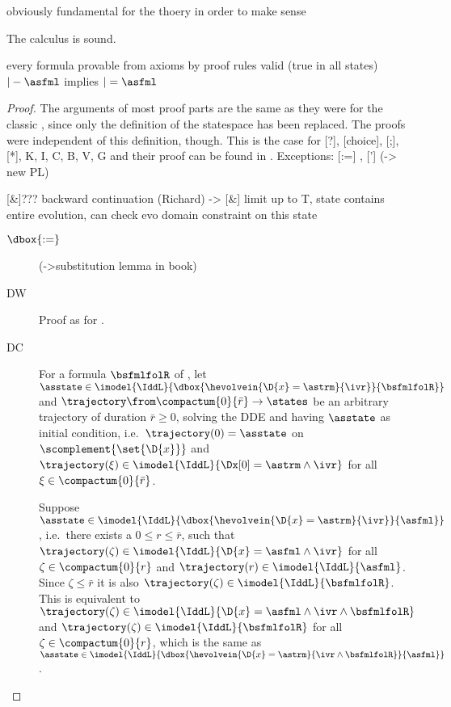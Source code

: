     obviously fundamental for the thoery in order to make sense

    \begin{theorem}
        \label{thm:dL-soundness}
        The \ddL calculus is sound.

        every formula provable from \ddL axioms by \ddL proof rules
        valid (true in all states)
        $|-\asfml$ implies $|=\asfml$

    \end{theorem}
    \begin{proof}
        The arguments of most proof parts are the same as they were for the classic \dL, since only the definition of the statespace has been replaced. The proofs were independent of this definition, though. This is the case for [?], [choice], [;], [*], K, I, C, B, V, G and their proof can be found in \cite{Platzer12Complete}.
        Exceptions: [:=] , ['] (-> new PL)

        [\&]???
        backward continuation (Richard) -> [\&] limit up to T, state contains entire evolution, can check evo domain constraint on this state

    \begin{description}
        \item[$\dbox{:=}$] (->substitution lemma in book)
        \item[DW] Proof as for \dL.
        \item[DC] For a formula $\bsfmlfolR$ of \FOLR, let $\asstate\in\imodel{\IddL}{\dbox{\hevolvein{\D{x}=\astrm}{\ivr}}{\bsfmlfolR}}$ and $\trajectory\from\compactum{0}{\bar{r}}\to\states$ be an arbitrary trajectory of duration $\bar{r}\geq 0$, solving the DDE and having $\asstate$ as initial condition, i.e.\ $\trajectory(0)=\asstate$ on $\scomplement{\set{\D{x}}}$ and $\trajectory(\xi)\in\imodel{\IddL}{\Dx[0]=\astrm\land\ivr}$ for all $\xi\in\compactum{0}{\bar{r}}$.

        Suppose $\asstate\in\imodel{\IddL}{\dbox{\hevolvein{\D{x}=\astrm}{\ivr}}{\asfml}}$, i.e.\ there exists a $0\leq r\leq\bar{r}$, such that $\trajectory(\zeta)\in\imodel{\IddL}{\D{x}=\asfml\land\ivr}$ for all $\zeta\in\compactum{0}{r}$ and $\trajectory(r)\in\imodel{\IddL}{\asfml}$. Since $\zeta\leq\bar{r}$ it is also $\trajectory(\zeta)\in\imodel{\IddL}{\bsfmlfolR}$. This is equivalent to $\trajectory(\zeta)\in\imodel{\IddL}{\D{x}=\asfml\land\ivr\land\bsfmlfolR}$ and $\trajectory(\zeta)\in\imodel{\IddL}{\bsfmlfolR}$ for all $\zeta\in\compactum{0}{r}$, which is the same as $\asstate\in\imodel{\IddL}{\dbox{\hevolvein{\D{x}=\astrm}{\ivr\land\bsfmlfolR}}{\asfml}}$.


\end{description}
\end{proof}
